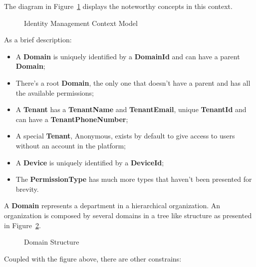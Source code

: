 The diagram in Figure~\ref{fig:design:domain:bounded_contexts:identity:diagram} displays the noteworthy concepts in this context.

\begin{figure}[H]
   \centering
  \resizebox{\columnwidth}{!}
  {
     
  }
  \caption[Identity Management Context Model]{Identity Management Context Model}
  \label{fig:design:domain:bounded_contexts:identity:diagram}
\end{figure}

As a brief description:

\begin{itemize}
   \item A \textbf{Domain} is uniquely identified by a \textbf{DomainId} and can have a parent \textbf{Domain};
   \item There's a root \textbf{Domain}, the only one that doesn't have a parent and has all the available permissions;
   \item A \textbf{Tenant} has a \textbf{TenantName} and \textbf{TenantEmail}, unique \textbf{TenantId} and can have a \textbf{TenantPhoneNumber};
   \item A special \textbf{Tenant}, Anonymous, exists by default to give access to users without an account in the platform;
   \item A \textbf{Device} is uniquely identified by a \textbf{DeviceId};
   \item The \textbf{PermissionType} has much more types that haven't been presented for brevity.
\end{itemize}

A \textbf{Domain} represents a department in a hierarchical organization. An organization is composed by several domains in a tree like structure as presented in Figure~\ref{fig:design:domain:bounded_contexts:identity:organization}.

\begin{figure}[H]
   \centering
  \resizebox{\columnwidth}{!}
  {
     
  }
  \caption[Domain Structure]{Domain Structure}
  \label{fig:design:domain:bounded_contexts:identity:organization}
\end{figure}

Coupled with the figure above, there are other constrains:

